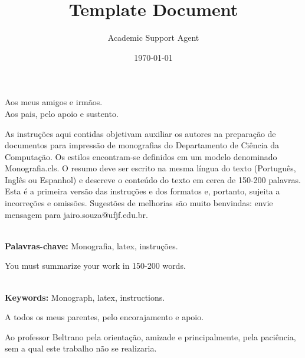 \documentclass{article}
\title{Template Document}
\author{Academic Support Agent}
\date{\today}
\begin{document}
\maketitle





\begin{dedicatoria}
Aos meus amigos e irm\~aos.\\
Aos pais, pelo apoio e sustento.\\
\end{dedicatoria}


 As instru\c{c}\~oes aqui contidas objetivam auxiliar os autores na prepara\c{c}\~ao de documentos para impress\~ao de monografias do Departamento de Ci\^encia da Computa\c{c}\~ao. Os estilos encontram-se definidos em um modelo denominado Monografia.cls. O resumo deve ser escrito na mesma l\'ingua do texto (Portugu\^es, Ingl\^es ou Espanhol) e descreve o conte\'udo do texto em cerca de 150-200 palavras. Esta \'e a primeira vers\~ao das instru\c{c}\~oes e dos formatos e, portanto, sujeita a incorre\c{c}\~oes e omiss\~oes. Sugest\~oes de melhorias s\~ao muito benvindas: envie mensagem para jairo.souza@ufjf.edu.br.

\noindent \\ \textbf{Palavras-chave:} Monografia, latex, instru\c{c}\~oes.



 You must summarize your work in 150-200 words.

\noindent \\ \textbf{Keywords:} Monograph, latex, instructions.





 \indent\indent 
A todos os meus parentes, pelo encorajamento e
apoio.

Ao professor Beltrano pela orienta\c{c}\~ao, amizade e
principalmente, pela paci\^encia, sem a qual este trabalho n\~ao se
realizaria.
\end{document}
